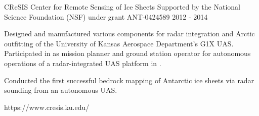 \begin{cventries}
\cvprojwideentry
  	{CReSIS} %
  	{Center for Remote Sensing of Ice Sheets} %
    {Supported by the National Science Foundation (NSF) under grant ANT-0424589} %
    {2012 - 2014} %
    {
      \begin{cvitems} %
        \item {Designed and manufactured various components for radar integration and Arctic outfitting of the University of Kansas Aerospace Department's G1X UAS. Participated in  as mission planner and ground station operator for autonomous operations of a radar-integrated UAS platform in .}
        \item {Conducted the first successful bedrock mapping of Antarctic ice sheets via radar sounding from an autonomous UAS.}
      \end{cvitems}
    } %
    {https://www.cresis.ku.edu/} %
    {\showprojectdescriptions}
    
\end{cventries}
